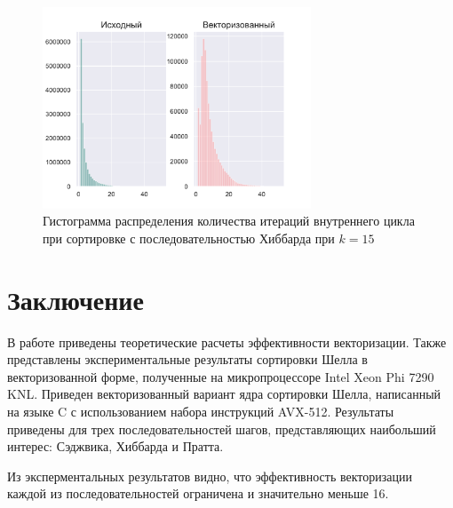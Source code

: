 \documentclass[utf8]{psta}
\begin{document}
\begin{figure}
\includegraphics[width=8cm,height=6cm]{pics/pic_hibbard_k_15}
\caption{Гистограмма распределения количества итераций внутреннего цикла при сортировке с последовательностью Хиббарда при $k = 15$}
\label{pic:hibbard_k_15}
\end{figure}



\section*{Заключение}

В работе приведены теоретические расчеты эффективности векторизации. 
Также представлены экспериментальные результаты сортировки Шелла в векторизованной форме, полученные на микропроцессоре Intel Xeon Phi 7290 KNL.
Приведен векторизованный вариант ядра сортировки Шелла, написанный на языке C с использованием набора инструкций AVX-512. 
Результаты приведены для трех последовательностей шагов, представляющих наибольший интерес: Сэджвика, Хиббарда и Пратта. 

Из эксперментальных результатов видно, что эффективность векторизации каждой из последовательностей ограничена и значительно меньше 16.
\end{document}
